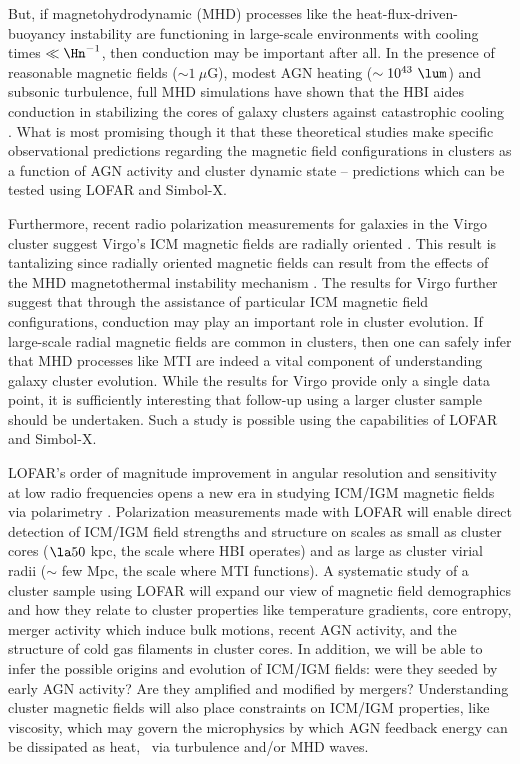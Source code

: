 \documentclass[11pt]{article}
\begin{document}
But, if magnetohydrodynamic (MHD) processes like the
heat-flux-driven-buoyancy instability
\cite[HBI,][]{2008ApJ...677L...9P} are functioning in large-scale
environments with cooling times $\ll \Hn^{-1}$, then conduction may be
important after all. In the presence of reasonable magnetic fields
($\sim 1~\mu$G), modest AGN heating ($\sim 10^{43}~\lum$) and subsonic
turbulence, full MHD simulations have shown that the HBI aides
conduction in stabilizing the cores of galaxy clusters against
catastrophic cooling \cite{2009ApJ...703...96P,
  2009arXiv0911.5198R}. What is most promising though it that these
theoretical studies make specific observational predictions regarding
the magnetic field configurations in clusters as a function of AGN
activity and cluster dynamic state -- predictions which can be tested
using LOFAR and Simbol-X.

Furthermore, recent radio polarization measurements for galaxies in
the Virgo cluster suggest Virgo's ICM magnetic fields are radially
oriented \cite{2009arXiv0911.2476P}. This result is tantalizing since
radially oriented magnetic fields can result from the effects of the
MHD magnetothermal instability mechanism
\cite[MTI,][]{2000ApJ...534..420B}. The results for Virgo further
suggest that through the assistance of particular ICM magnetic field
configurations, conduction may play an important role in cluster
evolution. If large-scale radial magnetic fields are common in
clusters, then one can safely infer that MHD processes like MTI are
indeed a vital component of understanding galaxy cluster
evolution. While the results for Virgo provide only a single data
point, it is sufficiently interesting that follow-up using a larger
cluster sample should be undertaken. Such a study is possible using
the capabilities of LOFAR and Simbol-X.

LOFAR's order of magnitude improvement in angular resolution and
sensitivity at low radio frequencies opens a new era in studying ICM/IGM
magnetic fields via polarimetry
\cite{2009ASPC..407...33A}. Polarization measurements made with LOFAR
will enable direct detection of ICM/IGM field strengths and structure on
scales as small as cluster cores ($\la 50$ kpc, the scale where HBI
operates) and as large as cluster virial radii ($\sim$ few Mpc, the
scale where MTI functions). A systematic study of a cluster sample
using LOFAR will expand our view of magnetic field demographics and
how they relate to cluster properties like temperature gradients, core
entropy, merger activity which induce bulk motions, recent AGN
activity, and the structure of cold gas filaments in cluster cores. In
addition, we will be able to infer the possible origins and evolution
of ICM/IGM fields: were they seeded by early AGN activity? Are they
amplified and modified by mergers? Understanding cluster magnetic
fields will also place constraints on ICM/IGM properties, like viscosity,
which may govern the microphysics by which AGN feedback energy can be
dissipated as heat, \eg\ via turbulence and/or MHD waves.
\end{document}
